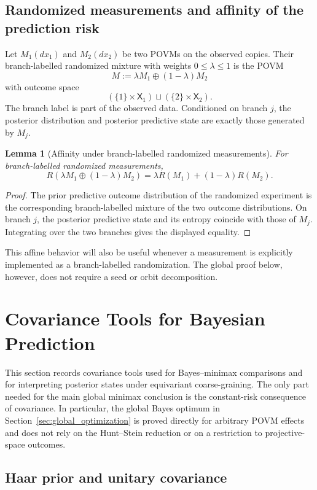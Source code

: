\documentclass[journal]{IEEEtran}
\newtheorem{lemma}[theorem]{Lemma}
\begin{document}
\subsection{Randomized measurements and affinity of the prediction risk}
\label{subsec:randomized_measurements_affinity}
Let \(M_1(dx_1)\) and \(M_2(dx_2)\) be two POVMs on the observed copies.  Their
branch-labelled randomized mixture with weights \(0\le\lambda\le1\) is the POVM
\[
    M:=\lambda M_1\oplus(1-\lambda)M_2
\]
with outcome space
\[
    (\{1\}\times\mathsf X_1)\sqcup(\{2\}\times\mathsf X_2).
\]
The branch label is part of the observed data.  Conditioned on branch \(j\), the
posterior distribution and posterior predictive state are exactly those
generated by \(M_j\).
\begin{lemma}[Affinity under branch-labelled randomized measurements]
\label{lem:measurement_affinity}
For branch-labelled randomized measurements,
\[
    R(\lambda M_1\oplus(1-\lambda)M_2)
    =
    \lambda R(M_1)+(1-\lambda)R(M_2).
\]
\end{lemma}
\begin{proof}
The prior predictive outcome distribution of the randomized experiment is the
corresponding branch-labelled mixture of the two outcome distributions.  On
branch \(j\), the posterior predictive state and its entropy coincide with those
of \(M_j\).  Integrating over the two branches gives the displayed equality.
\end{proof}
This affine behavior will also be useful whenever a measurement is explicitly
implemented as a branch-labelled randomization.  The global proof below,
however, does not require a seed or orbit decomposition.

\section{Covariance Tools for Bayesian Prediction}
\label{sec:covariant_reduction}

This section records covariance tools used for Bayes--minimax comparisons and
for interpreting posterior states under equivariant coarse-graining.  The only
part needed for the main global minimax conclusion is the constant-risk
consequence of covariance.  In particular, the global Bayes optimum in
Section~\ref{sec:global_optimization} is proved directly for arbitrary POVM
effects and does not rely on the Hunt--Stein reduction or on a restriction to
projective-space outcomes.

\subsection{Haar prior and unitary covariance}
\label{subsec:haar_covariance}
\end{document}
